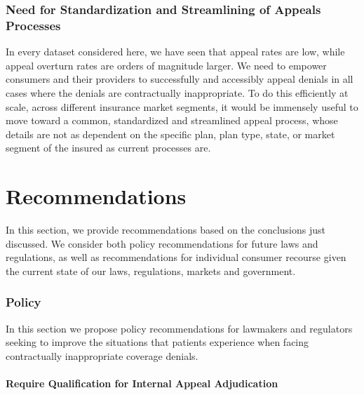 \documentclass[12pt, a4paper,twoside,parskip=full]{report}
\theoremstyle{plain} %
\theoremstyle{definition} %
\theoremstyle{remark} %
\numberwithin{equation}{chapter}
\begin{document}
		\subsection{Need for Standardization and Streamlining of Appeals Processes}
		
		In every dataset considered here, we have seen that appeal rates are low, while appeal overturn rates are orders of magnitude larger. We need to empower consumers and their providers to successfully and accessibly appeal denials in all cases where the denials are contractually inappropriate. To do this efficiently at scale, across different insurance market segments, it
		would be immensely useful to move toward a common, standardized and streamlined appeal process, whose details are not 
		as dependent on the specific plan, plan type, state, or market segment of the insured as current processes are.
		
		\chapter{Recommendations}\label{recommendations}
		
		In this section, we provide recommendations based on the conclusions just discussed. We consider both policy recommendations for future laws and regulations, as well as recommendations for individual consumer recourse given the current state of our laws, regulations, markets and government.
		
		\subsection{Policy}
		
		In this section we propose policy recommendations for lawmakers and regulators seeking to improve the situations that patients experience when facing contractually inappropriate coverage denials.
		
		\subsubsection{Require Qualification for Internal Appeal Adjudication}
		
\end{document}
